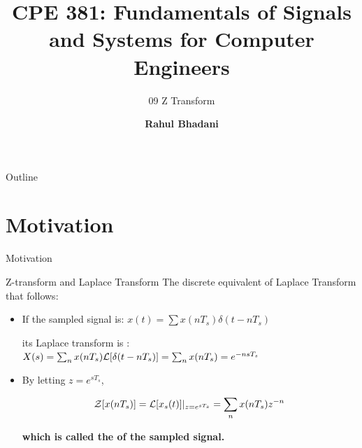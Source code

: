 \documentclass[aspectratio=169,xcolor=dvipsnames,svgnames,x11names,fleqn]{beamer}
\title[CPE 381: Signals and Systems]{CPE 381: Fundamentals of Signals and Systems for Computer Engineers} %
\subtitle{09 Z Transform}
\author[Rahul Bhadani] {{\Large \textbf{Rahul Bhadani}}}
\institute[UAH] %
{
    Electrical \& Computer Engineering,  The University of Alabama in Huntsville
}
\date
\begin{document}
\begin{frame}
\titlepage
\end{frame}

\begin{frame}{Outline}
    \tableofcontents
\end{frame}



\section{Motivation}


\begin{frame}{}
    \begin{center}
    \Huge \bf \color{DarkBlue}
    \faFire
    
    Motivation
\end{center}
\end{frame}




\begin{frame}{Z-transform and Laplace Transform}
    The discrete equivalent of Laplace Transform that follows:
\begin{itemize}
    \item If the sampled signal is: $x(t) = \sum x(nT_s)\delta(t-nT_s)$
  
    its Laplace transform is : $X(s) = \sum_{n} x(nT_s) {\mathcal L}[\delta(t - nT_s)] = \sum_n x(nT_s) = e^{-ns T_s}$

    \item By letting $z = e^{sT_s}$, 

$$
{\mathcal Z} [ x(nT_s)] ={\mathcal L}[x_s(t)]|_{z = e^{sT_s}} = \sum_{n} x(nT_s) z^{-n}
$$

\textbf{which is called the {\color{red}{Z-transform}} of the sampled signal.}

    
\end{itemize}

\end{frame}
\end{document}
